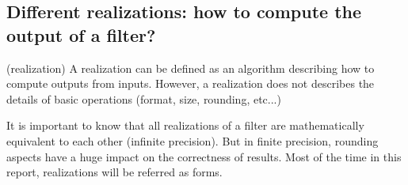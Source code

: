 	\subsection{Different realizations: how to compute the output of a filter?}
	\begin{thdef} (realization)
	A realization can be defined as an algorithm describing how to compute outputs
	from inputs. However, a realization does not describes the details of basic operations (format, size,
	rounding, etc...)
	\end{thdef}
	It is important to know that all realizations of a filter are mathematically equivalent to each other (infinite
	precision). But in finite precision, rounding aspects have a huge impact on the correctness of results.
	Most of the time in this report, realizations will be referred as forms.

